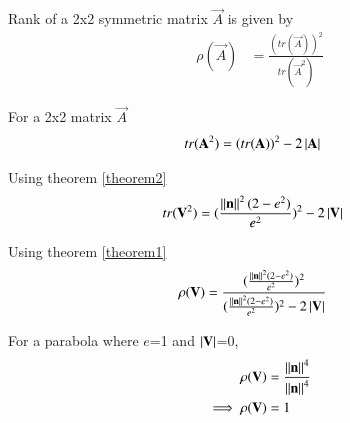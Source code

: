 \documentclass[journal,12pt,twocolumn]{IEEEtran}
\begin{document}
\begin{theorem}
\label{theorem1}
Rank of a 2x2 symmetric matrix $\vec{A}$ is given by
\begin{align}
    \rho(\vec{A}) &= \frac{(tr(\vec{A}))^2}{tr(\vec{A}^2)}
\end{align}
\end{theorem}

\begin{theorem}
For a 2x2 matrix $\vec{A}$
\label{theorem2}
\begin{align}
    tr(\mathbf{A}^2) &= (tr(\mathbf{A}))^2 - 2\left\vert\mathbf{A}\right\vert
\end{align}
\end{theorem}

Using theorem \ref{theorem2}
\begin{align}
    tr(\mathbf{V}^2) &= (\frac{\left\lVert\mathbf{n}\right\rVert^2(2-e^2)}{e^2})^2 - 2\left\vert\mathbf{V}\right\vert
\end{align}

Using theorem \ref{theorem1}
\begin{align}
    \rho(\mathbf{V}) &= \frac{(\frac{\left\lVert\mathbf{n}\right\rVert^2(2-e^2)}{e^2})^2}{(\frac{\left\lVert\mathbf{n}\right\rVert^2(2-e^2)}{e^2})^2 - 2\left\vert\mathbf{V}\right\vert}
\end{align}

For a parabola where $e$=1 and $\left\vert\mathbf{V}\right\vert$=0,
\begin{align}
    \rho(\mathbf{V}) &= \frac{\left\lVert\mathbf{n}\right\rVert^4}{\left\lVert\mathbf{n}\right\rVert^4}
    \\
    \implies \rho(\mathbf{V}) &= 1
\end{align}
\end{document}
